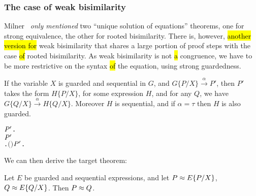 \subsubsection{The case of weak bisimilarity}

Milner~\cite{Mil89} \emph{only mentioned} two ``unique solution of
equations'' theorems, one for strong equivalence, the other for
rooted bisimilarity.   There is, however, \hl{another
version for} weak bisimilarity that shares a large portion of proof
steps with the case \hl{of} rooted bisimilarity.
As weak bisimilarity is not \hl{a} congruence, we have to be more restrictive
on the syntax \hl{of} the equation, using strong guardedness.

\begin{lemma}
If the variable $X$ is guarded and sequential in $G$, and
$G\{P/X\}\overset{\alpha}{\rightarrow} P'$, then $P'$ takes the form
$H\{P/X\}$, for some expression $H$, and for any $Q$, we have
$G\{Q/X\}\overset{\alpha}{\rightarrow} H\{Q/X\}$. Moreover $H$ is
sequential, and if $\alpha = \tau$ then $H$ is also guarded.
\begin{alltt}
\HOLTokenTurnstile{}   \HOLSymConst{\HOLTokenConj{}}   \HOLSymConst{\HOLTokenImp{}}
   \HOLSymConst{\HOLTokenForall{}}  \ensuremath{\HOLBoundVar{P}\sp{\prime}}.
         \HOLTokenTransBegin{}\HOLTokenTransEnd \ensuremath{\HOLBoundVar{P}\sp{\prime}} \HOLSymConst{\HOLTokenImp{}}
       \HOLSymConst{\HOLTokenExists{}}.   \HOLSymConst{\HOLTokenConj{}} \ensuremath{(} \HOLSymConst{\ensuremath{=}} \HOLSymConst{\ensuremath{\tau}} \HOLSymConst{\HOLTokenImp{}}  \ensuremath{)} \HOLSymConst{\HOLTokenConj{}} \ensuremath{\HOLBoundVar{P}\sp{\prime}} \HOLSymConst{\ensuremath{=}}   \HOLSymConst{\HOLTokenConj{}} \HOLSymConst{\HOLTokenForall{}}.   \HOLTokenTransBegin{}\HOLTokenTransEnd {} 
\end{alltt}
\end{lemma}

We can then derive the target theorem:
\begin{theorem}
Let $E$ be guarded and sequential expressions, and let $P \approx
E\{P/X\}$,
$Q \approx E\{Q/X\}$. Then $P \approx Q$.
\begin{alltt}
\HOLTokenTurnstile{}   \HOLSymConst{\HOLTokenConj{}}   \HOLSymConst{\HOLTokenConj{}}  \HOLSymConst{\HOLTokenWeakEQ}   \HOLSymConst{\HOLTokenConj{}}  \HOLSymConst{\HOLTokenWeakEQ}   \HOLSymConst{\HOLTokenImp{}}  \HOLSymConst{\HOLTokenWeakEQ} 
\end{alltt}
\end{theorem}

